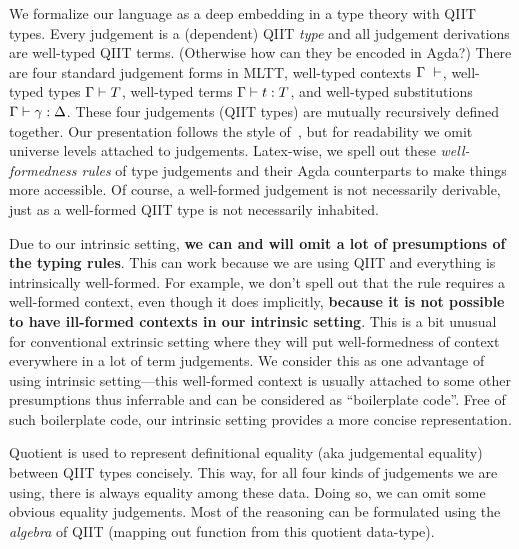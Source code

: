 

We formalize our language as a deep embedding in a type theory with QIIT types. Every judgement is a (dependent) QIIT \textit{type} and all judgement derivations are well-typed QIIT terms. (Otherwise how can they be encoded in Agda?) There are four standard judgement forms in MLTT,
well-typed contexts $\goodCtx{\Gamma}{l}$, well-typed types
$\goodType{\Gamma}{T}{l}$, well-typed terms $\goodTerm{\Gamma}{t}{T}$, and
well-typed substitutions $\goodSub{\Gamma}{\gamma}{\Delta}$. These four judgements (QIIT types) are
mutually recursively defined together. Our presentation
follows the style of~\citet{kaposi2019gluing}, but for readability we
omit universe levels attached to judgements.
Latex-wise, we spell out these \textit{well-formedness rules} of type
judgements and their Agda counterparts to make things more accessible. Of
course, a well-formed judgement is not necessarily derivable, just as
a well-formed QIIT type is not necessarily inhabited. 


Due to our intrinsic setting, \textbf{we can and will omit a lot of
presumptions of the typing rules}. This can work because we are using
QIIT and everything is intrinsically well-formed. For example, we don't
spell out that the rule  requires a well-formed
context, even though it does implicitly, \textbf{because it is not
possible to have ill-formed contexts in our intrinsic setting}. This is
a bit unusual for conventional extrinsic setting where they will put
well-formedness of context everywhere in a lot of term judgements. We
consider this as one advantage of using intrinsic setting---this
well-formed context is usually attached to some other presumptions thus
inferrable and can be considered as ``boilerplate code''. Free of
such boilerplate code, our intrinsic setting provides a more concise
representation.

Quotient is used to represent definitional equality (aka judgemental
equality) between QIIT types concisely.
This way, for all four kinds of judgements we are
using, there is always equality among these data. Doing so, we can omit
some obvious equality judgements. Most of the reasoning can be formulated
using the \textit{algebra} of QIIT (mapping out function from this
quotient data-type). 

